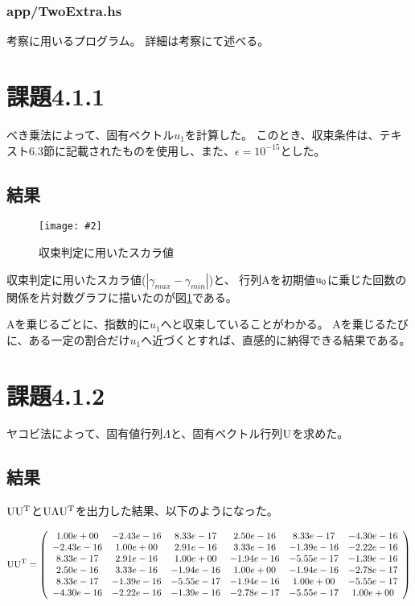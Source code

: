 \documentclass[11pt]{jsarticle}
\newcommand{\fg}[3]{ %
    \begin{figure}
        \centering
        \texttt{[image: \#2]}
        \caption{#3}
        \label{#1}
    \end{figure}
}
\newcommand{\fr}[1]{図\ref{#1}}
\begin{document}
\subsubsection*{app/TwoExtra.hs}
考察に用いるプログラム。
詳細は考察にて述べる。


\section{課題4.1.1}
べき乗法によって、固有ベクトル$u_1$を計算した。
このとき、収束条件は、テキスト6.3節に記載されたものを使用し、また、$\epsilon = 10 ^ {-15}$とした。
\subsection{結果}
\fg{fig1}{graph/4_1_1.png}{収束判定に用いたスカラ値}

収束判定に用いたスカラ値($\left| \gamma_{max} - \gamma_{min} \right|$)と、
行列Aを初期値${\rm u_0}$に乗じた回数の関係を片対数グラフに描いたのが\fr{fig1}である。

Aを乗じるごとに、指数的に$u_1$へと収束していることがわかる。
Aを乗じるたびに、ある一定の割合だけ$u_1$へ近づくとすれば、直感的に納得できる結果である。

\section{課題4.1.2}
ヤコビ法によって、固有値行列$\Lambda$と、固有ベクトル行列${\rm U}$を求めた。

\subsection{結果}

${\rm U} {\rm U}^{\rm T}$と${\rm U}\Lambda{\rm U}^{\rm T}$を出力した結果、以下のようになった。

\[
    {\rm U} {\rm U}^{\rm T} =
    \left(\begin{array}{cccccc}
        1.00e+00&-2.43e-16&8.33e-17&2.50e-16&8.33e-17&-4.30e-16\\
        -2.43e-16&1.00e+00&2.91e-16&3.33e-16&-1.39e-16&-2.22e-16\\
        8.33e-17&2.91e-16&1.00e+00&-1.94e-16&-5.55e-17&-1.39e-16\\
        2.50e-16&3.33e-16&-1.94e-16&1.00e+00&-1.94e-16&-2.78e-17\\
        8.33e-17&-1.39e-16&-5.55e-17&-1.94e-16&1.00e+00&-5.55e-17\\
        -4.30e-16&-2.22e-16&-1.39e-16&-2.78e-17&-5.55e-17&1.00e+00\\
    \end{array}\right)
\]
\end{document}
